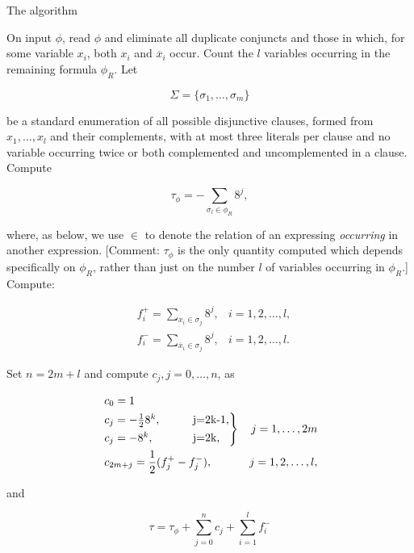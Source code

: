 \documentclass{amsart}
\makeatletter
\def\subsection{\@startsection{subsection}{3}%
  \z@{.5\linespacing\@plus.7\linespacing}{.1\linespacing}%
  {\normalfont}}
\newcommand{\ov}{\overline}
\theoremstyle{plain}
\makeatother
\begin{document}
\subsection{The algorithm}

On input $\phi$, read $\phi$ and eliminate all duplicate conjuncts and those in which, for some
variable $x_i$, both $x_i$ and $\ov{x}_i$ occur. Count the $l$ variables occurring in the remaining
formula $\phi_R$. Let

\begin{equation*}
  \Sigma = \{\sigma_1,\ldots,\sigma_m\}
\end{equation*}

be a standard enumeration of all possible disjunctive clauses, formed from $x_1,\ldots,x_l$ and
their complements, with at most three literals per clause and no variable occurring twice or both
complemented and uncomplemented in a clause. Compute

\begin{equation*}
  \tau_\phi = -\sum_{\sigma_l\in\phi_R}8^j,
\end{equation*}

where, as below, we use $\in$ to denote the relation of an expressing \textit{occurring} in another
expression. [Comment: $\tau_\phi$ is the only quantity computed which depends specifically on
$\phi_R$, rather than just on the number $l$ of variables occurring in $\phi_R$.] Compute:

\begin{align*}
  &f_i^+ = \sum_{x_i\in\sigma_j}8^j, &i=1,2,\ldots,l,\\
  &f_i^- = \sum_{\ov{x}_i\in\sigma_j}8^j, &i=1,2,\ldots,l.
\end{align*}

Set $n=2m+l$ and compute $c_j,j=0,\ldots,n$, as

\begin{align*}
  &\;c_0=1\\
  &\begin{rcases*}
  c_j=-\frac{1}{2}8^k,\qquad &j=2k-1,\\
  c_j=-8^k,\qquad &j=2k,\\
  \end{rcases*} &j=1,\ldots,2m\\
  &\;c_{2m+j}=\frac{1}{2}(f_j^+ - f_j^-), &j=1,2,\ldots,l,
\end{align*}

and

\begin{equation*}
  \tau = \tau_\phi + \sum_{j=0}^n c_j + \sum_{i=1}^l f_i^-
\end{equation*}
\end{document}
